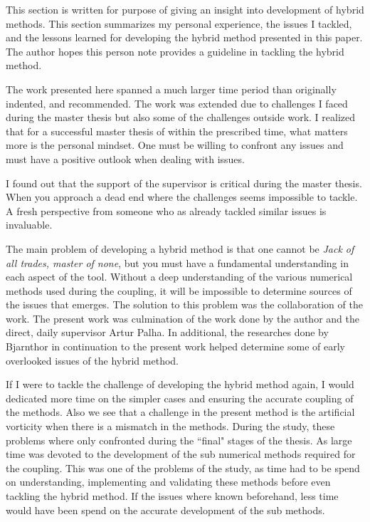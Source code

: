 
This section is written for purpose of giving an insight into development of hybrid methods. This section summarizes my personal experience, the issues I tackled, and the lessons learned for developing the hybrid method presented in this paper. The author hopes this person note provides a guideline in tackling the hybrid method.

The work presented here spanned a much larger time period than originally indented, and recommended. The work was extended due to challenges I faced during the master thesis but also some of the challenges outside work. I realized that for a successful master thesis of within the prescribed time, what matters more is the personal mindset. One must be willing to confront any issues and must have a positive outlook when dealing with issues. 

I found out that the support of the supervisor is critical during the master thesis. When you approach a dead end where the challenges seems impossible to tackle. A fresh perspective from someone who as already tackled similar issues is invaluable.

The main problem of developing a hybrid method is that one cannot be \textit{Jack of all trades, master of none}, but you must have a fundamental understanding in each aspect of the tool. Without a deep understanding of the various numerical methods used during the coupling, it will be impossible to determine sources of the issues that emerges. The solution to this problem was the collaboration of the work. The present work was culmination of the work done by the author and the direct, daily supervisor Artur Palha. In additional, the researches done by Bjarnthor in continuation to the present work helped determine some of early overlooked issues of the hybrid method. 

If I were to tackle the challenge of developing the hybrid method again, I would dedicated more time on the simpler cases and ensuring the accurate coupling of the methods. Also we see that a challenge in the present method is the artificial vorticity when there is a mismatch in the methods. During the study, these problems where only confronted during the ``final" stages of the thesis. As large time was devoted to the development of the sub numerical methods required for the coupling. This was one of the problems of the study, as time had to be spend on understanding, implementing and validating these methods before even tackling the hybrid method. If the issues where known beforehand, less time would have been spend on the accurate development of the sub methods.

